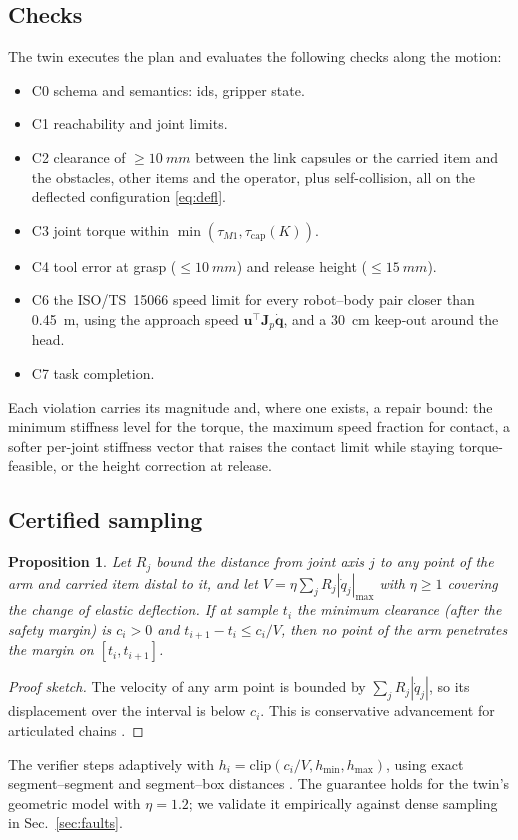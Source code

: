 \documentclass[journal]{IEEEtran}
\newtheorem{proposition}{Proposition}
\begin{document}
\subsection{Checks}
The twin executes the plan and evaluates the following checks along the motion:
\begin{itemize}
\item C0 schema and semantics: ids, gripper state.
\item C1 reachability and joint limits.
\item C2 clearance of $\ge\SI{10}{mm}$ between the link capsules or the carried item and the obstacles, other items and the operator, plus self-collision, all on the deflected configuration \eqref{eq:defl}.
\item C3 joint torque within $\min(\tau_{M1},\tau_\mathrm{cap}(K))$.
\item C4 tool error at grasp ($\le\SI{10}{mm}$) and release height ($\le\SI{15}{mm}$).
\item C6 the ISO/TS~15066 speed limit for every robot--body pair closer than \SI{0.45}{m}, using the approach speed $\bm u^\top\bm J_p\dot{\bm q}$, and a \SI{30}{cm} keep-out around the head.
\item C7 task completion.
\end{itemize}
Each violation carries its magnitude and, where one exists, a repair bound: the minimum stiffness level for the torque, the maximum speed fraction for contact, a softer per-joint stiffness vector that raises the contact limit while staying torque-feasible, or the height correction at release.

\subsection{Certified sampling}
\begin{proposition}
Let $R_j$ bound the distance from joint axis $j$ to any point of the arm and carried item distal to it, and let $V=\eta\sum_j R_j|\dot q_j|_{\max}$ with $\eta\ge1$ covering the change of elastic deflection. If at sample $t_i$ the minimum clearance (after the safety margin) is $c_i>0$ and $t_{i+1}-t_i\le c_i/V$, then no point of the arm penetrates the margin on $[t_i,t_{i+1}]$.
\end{proposition}
\begin{proof}[Proof sketch]
The velocity of any arm point is bounded by $\sum_j R_j|\dot q_j|$, so its displacement over the interval is below $c_i$. This is conservative advancement for articulated chains \cite{schwarzer2005}.
\end{proof}
The verifier steps adaptively with $h_i=\mathrm{clip}(c_i/V,h_{\min},h_{\max})$, using exact segment--segment and segment--box distances \cite{ericson2004}. The guarantee holds for the twin's geometric model with $\eta=1.2$; we validate it empirically against dense sampling in Sec.~\ref{sec:faults}.
\end{document}
